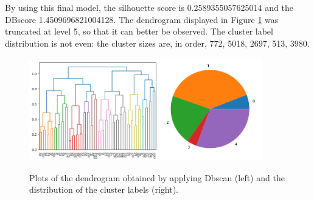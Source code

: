 \documentclass[10pt,a4paper]{report}
\begin{document}
By using this final model, the silhouette score is 0.2589355057625014 and the DBscore 1.4509696821004128.
The dendrogram displayed in Figure \ref{hiera} was truncated at level 5, so that it can better be observed.
The cluster label distribution is not even: the cluster sizes are, in order, 772, 5018, 2697, 513, 3980.

\begin{figure}[h]
	\centering
	\includegraphics[width=0.5\textwidth]{hiera_dendro}\includegraphics[width=0.4\textwidth]{hiera_distribution}
	\caption{Plots of the dendrogram obtained by applying Dbscan (left) and the distribution of the cluster labels (right).}
	\label{hiera}
\end{figure}
\end{document}
